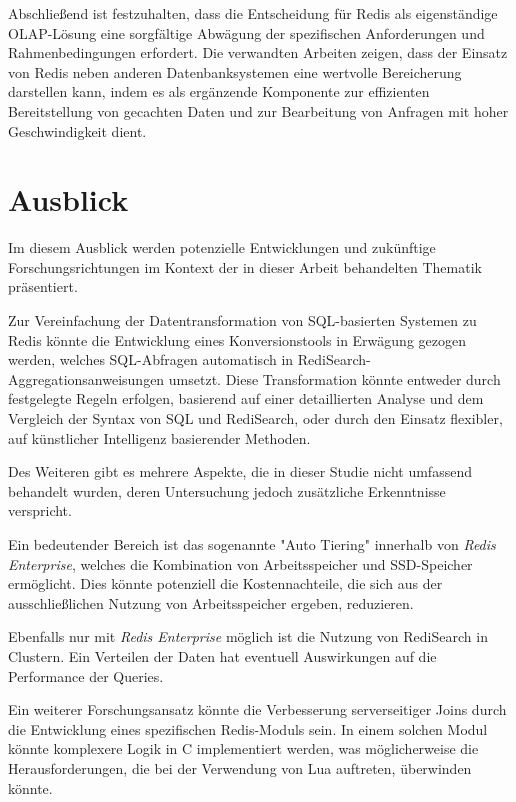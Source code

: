 Abschließend ist festzuhalten, dass die Entscheidung für Redis als eigenständige OLAP-Lösung eine sorgfältige Abwägung der spezifischen Anforderungen und Rahmenbedingungen erfordert. Die verwandten Arbeiten zeigen, dass der Einsatz von Redis neben anderen Datenbanksystemen eine wertvolle Bereicherung darstellen kann, indem es als ergänzende Komponente zur effizienten Bereitstellung von gecachten Daten und zur Bearbeitung von Anfragen mit hoher Geschwindigkeit dient. 

\section{Ausblick}
Im diesem Ausblick werden potenzielle Entwicklungen und zukünftige Forschungsrichtungen im Kontext der in dieser Arbeit behandelten Thematik präsentiert.

Zur Vereinfachung der Datentransformation von SQL-basierten Systemen zu Redis könnte die Entwicklung eines Konversionstools in Erwägung gezogen werden, welches SQL-Abfragen automatisch in RediSearch-Aggregationsanweisungen umsetzt. Diese Transformation könnte entweder durch festgelegte Regeln erfolgen, basierend auf einer detaillierten Analyse und dem Vergleich der Syntax von SQL und RediSearch, oder durch den Einsatz flexibler, auf künstlicher Intelligenz basierender Methoden.

Des Weiteren gibt es mehrere Aspekte, die in dieser Studie nicht umfassend behandelt wurden, deren Untersuchung jedoch zusätzliche Erkenntnisse verspricht.

Ein bedeutender Bereich ist das sogenannte "Auto Tiering" innerhalb von \emph{Redis Enterprise}, welches die Kombination von Arbeitsspeicher und SSD-Speicher ermöglicht. Dies könnte potenziell die Kostennachteile, die sich aus der ausschließlichen Nutzung von Arbeitsspeicher ergeben, reduzieren.

Ebenfalls nur mit \emph{Redis Enterprise} möglich ist die Nutzung von RediSearch in Clustern. Ein Verteilen der Daten hat eventuell Auswirkungen auf die Performance der Queries.

Ein weiterer Forschungsansatz könnte die Verbesserung serverseitiger Joins durch die Entwicklung eines spezifischen Redis-Moduls sein. In einem solchen Modul könnte komplexere Logik in C implementiert werden, was möglicherweise die Herausforderungen, die bei der Verwendung von Lua auftreten, überwinden könnte.